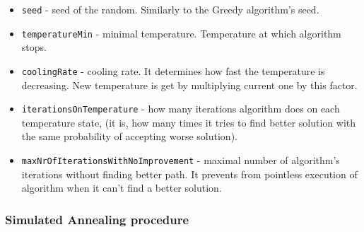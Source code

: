 \documentclass[titlepage]{article}
\begin{document}
\begin{itemize}
	\item \texttt{seed} - seed of the random. Similarly to the Greedy algorithm's seed.
	
	\item \texttt{temperatureMin} - minimal temperature. Temperature at which algorithm stops.
	
	\item \texttt{coolingRate} - cooling rate. It determines how fast the temperature is decreasing. New temperature is get by multiplying current one by this factor.
	
	\item \texttt{iterationsOnTemperature} - how many iterations algorithm does on each temperature state, (it is, how many times it tries to find better solution with the same probability of accepting worse solution).
	
	\item \texttt{maxNrOfIterationsWithNoImprovement} - maximal number of algorithm's iterations without finding better path. It prevents from pointless execution of algorithm when it can't find a better solution.
\end{itemize}

\subsubsection{Simulated Annealing procedure}
\end{document}
